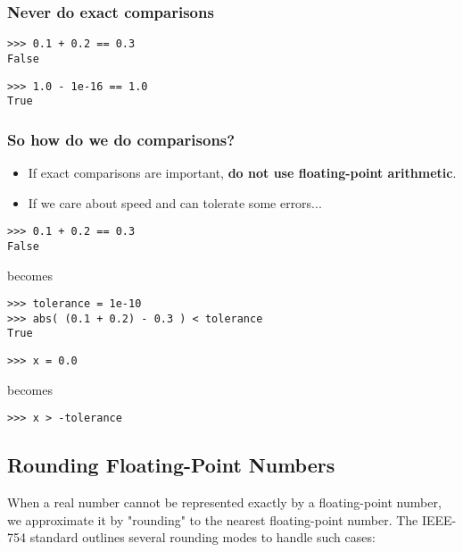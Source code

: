 \documentclass[12pt]{article}
\begin{document}
\subsubsection{Never do exact comparisons}

\begin{lstlisting}
>>> 0.1 + 0.2 == 0.3
False
\end{lstlisting}

\begin{lstlisting}
>>> 1.0 - 1e-16 == 1.0
True
\end{lstlisting}

\subsubsection{So how do we do comparisons?} %

\begin{itemize}
  \item If exact comparisons are important, \textbf{do not use floating-point arithmetic}.
  \item If we care about speed and can tolerate some errors...
\end{itemize}

\begin{lstlisting}
>>> 0.1 + 0.2 == 0.3
False
\end{lstlisting}

becomes

\begin{lstlisting}
>>> tolerance = 1e-10
>>> abs( (0.1 + 0.2) - 0.3 ) < tolerance
True
\end{lstlisting}

\begin{lstlisting}
>>> x = 0.0
\end{lstlisting}

becomes

\begin{lstlisting}
>>> x > -tolerance
\end{lstlisting}



\subsection{Rounding Floating-Point Numbers}
When a real number cannot be represented exactly by a floating-point number, we approximate it by "rounding" to the nearest floating-point number. The IEEE-754 standard outlines several rounding modes to handle such cases:
\end{document}
